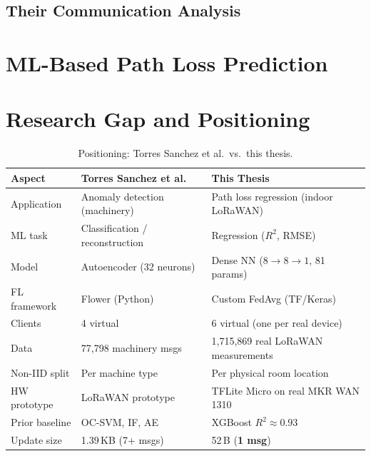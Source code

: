 \documentclass[12pt, a4paper, twoside, openright]{report}
\begin{document}
\subsection{Their Communication Analysis}

\section{ML-Based Path Loss Prediction}
\label{sec:ml-pathloss-related}

\section{Research Gap and Positioning}
\label{sec:research-gap}

\begin{table}[H]
  \centering
  \begin{tabular}{p{3.5cm} p{4cm} p{4cm}}
    \toprule
    \textbf{Aspect} & \textbf{Torres Sanchez et al.} & \textbf{This Thesis} \\
    \midrule
    Application       & Anomaly detection (machinery) & Path loss regression (indoor LoRaWAN) \\[3pt]
    ML task           & Classification / reconstruction & Regression ($R^2$, RMSE) \\[3pt]
    Model             & Autoencoder (32 neurons) & Dense NN ($8\to8\to1$, 81 params) \\[3pt]
    FL framework      & Flower (Python) & Custom FedAvg (TF/Keras) \\[3pt]
    Clients           & 4 virtual & 6 virtual (one per real device) \\[3pt]
    Data              & 77,798 machinery msgs & 1,715,869 real LoRaWAN measurements \\[3pt]
    Non-IID split     & Per machine type & Per physical room location \\[3pt]
    HW prototype      & LoRaWAN prototype & TFLite Micro on real MKR WAN 1310 \\[3pt]
    Prior baseline    & OC-SVM, IF, AE & XGBoost $R^2 \approx 0.93$ \\[3pt]
    Update size       & 1.39\,KB (7+ msgs) & 52\,B (\textbf{1 msg}) \\
    \bottomrule
  \end{tabular}
  \caption{Positioning: Torres Sanchez et al.\ vs.\ this thesis.}
  \label{tab:positioning}
\end{table}
\end{document}
